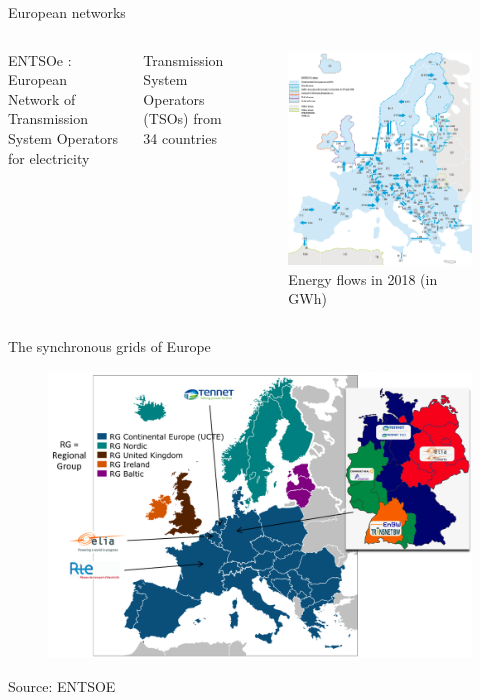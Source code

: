 \begin{frame}
{European networks}
\begin{columns}
ENTSOe :
European Network of Transmission System Operators
for electricity
\par{} Transmission System Operators (TSOs) from 34 countries
\begin{figure}
\centering
\includegraphics[width=\linewidth]{images/EU_net_flows.png}
\caption*{Energy flows in 2018 (in GWh)}
\end{figure}
\end{columns}
\end{frame}

\begin{frame}
{The synchronous grids of Europe}
\begin{figure}
\centering
\includegraphics[width=\linewidth]{images/EU_TSOs.png}
\end{figure}
\vfill
\footnotesize{Source: ENTSOE}
\end{frame}

